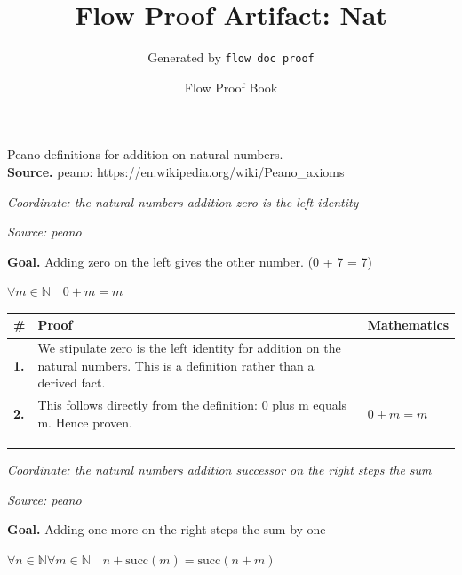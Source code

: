 \documentclass[11pt]{article}
\title{Flow Proof Artifact: Nat}
\author{Generated by \texttt{flow doc proof}}
\date{Flow Proof Book}
\theoremstyle{definition}
\begin{document}
\maketitle
Peano definitions for addition on natural numbers.\\[0.5em]
\textbf{Source.} peano: https://en.wikipedia.org/wiki/Peano\_axioms\\[0.5em]
\bigskip
{}\par
\smallskip\noindent\textit{Coordinate: the natural numbers \cdot addition \cdot zero is the left identity}\par
\smallskip\noindent\textit{Source: peano}\par
\medskip
\noindent\textbf{Goal.} Adding zero on the left gives the other number.  (0 + 7 = 7)\par
\noindent$\displaystyle \forall m \in \mathbb{N}\quad 0 + m = m$\par
\medskip
\noindent
\begin{tabular}{@{} >{\raggedright\arraybackslash}p{} >{\raggedright\arraybackslash}p{} >{\raggedleft\arraybackslash}p{} @{}}
\textbf{\#} & \textbf{Proof} & \textbf{Mathematics} \\
\midrule
\textbf{1.} & We stipulate zero is the left identity for addition on the natural numbers. This is a definition rather than a derived fact. & \\[0.45em]
\textbf{2.} & This follows directly from the definition: 0 plus m equals m. Hence proven. & $\displaystyle 0 + m = m$ \\[0.45em]
\bottomrule
\end{tabular}
\label{thm:Nat-addition-zero_is_the_left_identity}
\par\medskip\hrule
\bigskip
{}\par
\smallskip\noindent\textit{Coordinate: the natural numbers \cdot addition \cdot successor on the right steps the sum}\par
\smallskip\noindent\textit{Source: peano}\par
\medskip
\noindent\textbf{Goal.} Adding one more on the right steps the sum by one\par
\noindent$\displaystyle \forall n \in \mathbb{N} \forall m \in \mathbb{N}\quad n + \mathrm{succ}(m) = \mathrm{succ}(n + m)$\par
\end{document}
